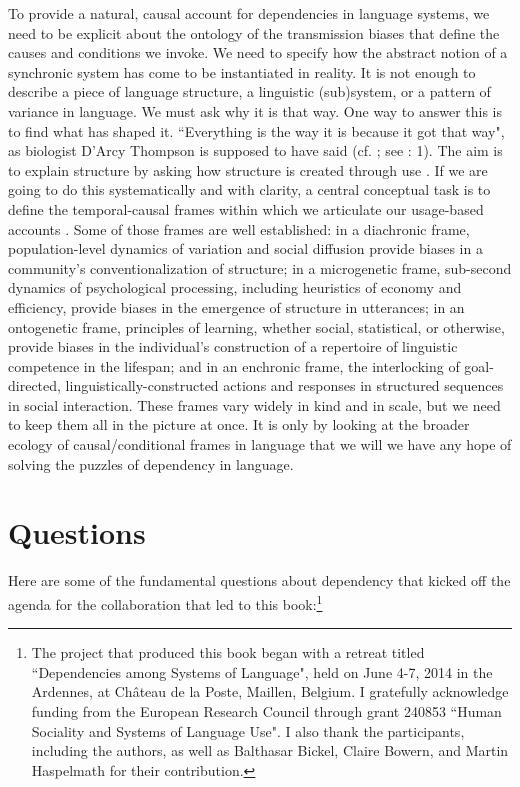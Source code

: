 \documentclass[output=paper]{langsci/langscibook}
\begin{document}
    To provide a natural, causal account for dependencies in language systems, we need to be explicit about the ontology of the transmission biases that define the causes and conditions we invoke. We need to specify how the abstract notion of a synchronic system has come to be instantiated in reality. It is not enough to describe a piece of language structure, a linguistic (sub)system, or a pattern of variance in language. We must ask why it is that way. One way to answer this is to find what has shaped it. ``Everything is the way it is because it got that way", as biologist D’Arcy Thompson is supposed to have said (cf. \citealt{Thompson1917}; see \citealt{Bybee2010}: 1). The aim is to explain structure by asking how structure is created through use \citep{Croft2004}. If we are going to do this systematically and with clarity, a central conceptual task is to define the temporal-causal frames within which we articulate our usage-based accounts \citep[see][9-21]{Enfield2014}. Some of those frames are well established: in a diachronic frame, population-level dynamics of variation and social diffusion provide biases in a community’s conventionalization of structure; in a microgenetic frame,   sub-second dynamics of psychological processing, including heuristics of economy and efficiency, provide biases in the emergence of structure in utterances; in an ontogenetic frame, principles of learning, whether social, statistical, or otherwise, provide biases in the individual’s construction of a repertoire of linguistic competence in the lifespan; and in an enchronic frame, the interlocking of goal-directed, linguistically-constructed actions and responses in structured sequences in social interaction. These frames vary widely in kind and in scale, but we need to keep them all in the picture at once. It is only by looking at the broader ecology of causal/conditional frames in language that we will we have any hope of solving the puzzles of dependency in language.

\section{Questions}

Here are some of the fundamental questions about dependency that kicked off the agenda for the collaboration that led to this book:\footnote{ The project that produced this book began with a retreat titled ``Dependencies among Systems of Language", held on June 4-7, 2014 in the Ardennes, at Château de la Poste, Maillen, Belgium. I gratefully acknowledge funding from the European Research Council through grant 240853 ``Human Sociality and Systems of Language Use". I also thank the participants, including the authors, as well as Balthasar Bickel, Claire Bowern, and Martin Haspelmath for their contribution.} 
\end{document}
